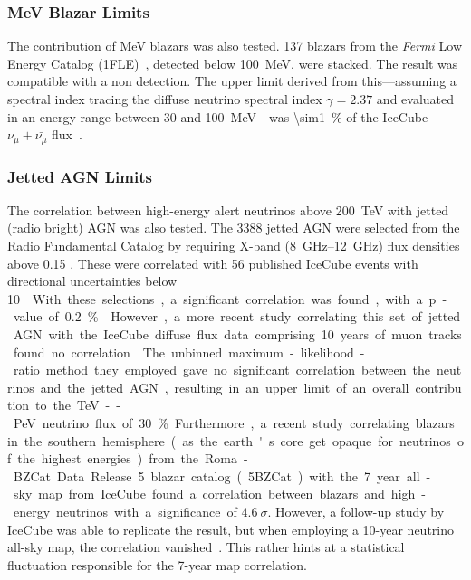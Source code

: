 \subsubsection{MeV Blazar Limits}
The contribution of MeV blazars was also tested. 137 blazars from the \textit{Fermi} Low Energy Catalog (1FLE)~, detected below \SI{100}{\mega\eV}, were stacked. The result was compatible with a non detection. The upper limit derived from this---assuming a spectral index tracing the diffuse neutrino spectral index $\gamma=2.37$ and evaluated in an energy range between 30 and \SI{100}{\mega\eV}---was \SI{\sim1}{\percent} of the IceCube $\nu_\mu+\bar{\nu_\mu}$ flux~.

\subsubsection{Jetted AGN Limits}

The correlation between high-energy alert neutrinos above \SI{200}{\tera\eV} with jetted (radio bright) AGN was also tested. The 3388 jetted AGN were selected from the Radio Fundamental Catalog by requiring X-band (\SIrange{8}{12}{\giga\Hz}) flux densities above 0.15 \unit{\jansky}. These were correlated with 56 published IceCube events with directional uncertainties below \SI{10}{\square\deg}. With these selections, a significant correlation was found, with a p-value of \SI{0.2}{\percent}~.

However, a more recent study correlating this set of jetted AGN with the IceCube diffuse flux data comprising 10 years of muon tracks found no correlation~. The unbinned maximum-likelihood-ratio method they employed gave no significant correlation between the neutrinos and the jetted AGN, resulting in an upper limit of an overall contribution to the \unit{\tera\eV}--\unit{\peta\eV} neutrino flux of \SI{30}{\percent}.

Furthermore, a recent study correlating blazars in the southern hemisphere (as the earth's core get opaque for neutrinos of the highest energies) from the Roma-BZCat Data Release 5 blazar catalog (5BZCat) with the 7 year all-sky map from IceCube found a correlation between blazars and high-energy neutrinos with a significance of $4.6~\sigma$. However, a follow-up study by IceCube was able to replicate the result, but when employing a 10-year neutrino all-sky map, the correlation vanished~. This rather hints at a statistical fluctuation responsible for the 7-year map correlation.

